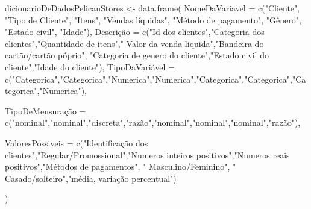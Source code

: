 \documentclass[
]{article}
\newenvironment{Shaded}{\begin{snugshade}}{\end{snugshade}}
\newcommand{\AttributeTok}[1]{\textcolor[rgb]{0.77,0.63,0.00}{#1}}
\newcommand{\FunctionTok}[1]{\textcolor[rgb]{0.00,0.00,0.00}{#1}}
\newcommand{\NormalTok}[1]{#1}
\newcommand{\OtherTok}[1]{\textcolor[rgb]{0.56,0.35,0.01}{#1}}
\newcommand{\StringTok}[1]{\textcolor[rgb]{0.31,0.60,0.02}{#1}}
\begin{document}
\begin{Shaded}
\begin{Highlighting}[]
\NormalTok{dicionarioDeDadosPelicanStores }\OtherTok{\textless{}{-}} \FunctionTok{data.frame}\NormalTok{(}
                   \AttributeTok{NomeDaVariavel =} \FunctionTok{c}\NormalTok{(}\StringTok{"Cliente"}\NormalTok{, }\StringTok{"Tipo de Cliente"}\NormalTok{, }\StringTok{"Itens"}\NormalTok{,}
                                \StringTok{"Vendas líquidas"}\NormalTok{, }\StringTok{"Método de pagamento"}\NormalTok{, }\StringTok{"Gênero"}\NormalTok{,}
                                \StringTok{"Estado civil"}\NormalTok{, }\StringTok{"Idade"}\NormalTok{),}
\NormalTok{                   Descrição }\OtherTok{=} \FunctionTok{c}\NormalTok{(}\StringTok{"Id dos clientes"}\NormalTok{,}\StringTok{"Categoria dos clientes"}\NormalTok{,}\StringTok{"Quantidade de itens"}\NormalTok{,}\StringTok{" Valor da venda liquida"}\NormalTok{,}\StringTok{"Bandeira do cartão/cartão póprio"}\NormalTok{,}
                                 \StringTok{"Categoria de genero do cliente"}\NormalTok{,}\StringTok{"Estado civil do cliente"}\NormalTok{,}\StringTok{"Idade do cliente"}\NormalTok{),}
\NormalTok{                   TipoDaVariável }\OtherTok{=} \FunctionTok{c}\NormalTok{(}\StringTok{"Categorica"}\NormalTok{,}\StringTok{"Categorica"}\NormalTok{,}\StringTok{"Numerica"}\NormalTok{,}\StringTok{"Numerica"}\NormalTok{,}\StringTok{"Categorica"}\NormalTok{,}\StringTok{"Categorica"}\NormalTok{,}\StringTok{"Categorica"}\NormalTok{,}\StringTok{"Numerica"}\NormalTok{),}
                   
\NormalTok{                   TipoDeMensuração }\OtherTok{=} \FunctionTok{c}\NormalTok{(}\StringTok{"nominal"}\NormalTok{,}\StringTok{"nominal"}\NormalTok{,}\StringTok{"discreta"}\NormalTok{,}\StringTok{"razão"}\NormalTok{,}\StringTok{"nominal"}\NormalTok{,}\StringTok{"nominal"}\NormalTok{,}\StringTok{"nominal"}\NormalTok{,}\StringTok{"razão"}\NormalTok{),}
                   
                   \AttributeTok{ValoresPossiveis =} \FunctionTok{c}\NormalTok{(}\StringTok{"Identificação dos clientes"}\NormalTok{,}\StringTok{"Regular/Promossional"}\NormalTok{,}\StringTok{"Numeros inteiros positivos"}\NormalTok{,}\StringTok{"Numeros reais positivos"}\NormalTok{,}\StringTok{"Métodos de pagamentos"}\NormalTok{, }\StringTok{" Masculino/Feminino"}\NormalTok{, }\StringTok{" Casado/solteiro"}\NormalTok{,}\StringTok{"média, variação percentual"}\NormalTok{)}
                   
                   
\NormalTok{                   )}
\end{Highlighting}
\end{Shaded}
\end{document}
